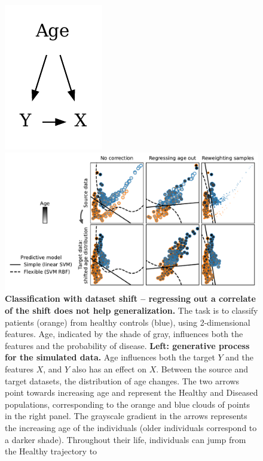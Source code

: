 \documentclass[a4paper,num-refs]{oup-contemporary}
\begin{document}
\begin{figure}[t!]
\begin{minipage}{.44\textwidth}
    \hspace*{.05\linewidth}%
    \includegraphics[width=.23\textwidth]{figures/graphs/parabolas_dataset.pdf}
  \end{minipage}%
  \hspace{-.2\textwidth}%
  \begin{minipage}{.69\textwidth}
    \includegraphics[width=\textwidth]{figures/simulations/parabolas_correction_and_shift/parabolas.pdf}
  \end{minipage}%
\caption{\label{fig:parabolas} %
  \textbf{Classification with dataset shift -- regressing out a correlate of the
shift does not help generalization.} The task is to classify patients
(orange) from healthy controls (blue), using
2-dimensional features. Age, indicated by the shade of gray, influences
both the features and the probability of disease.
  \textbf{Left: generative process for the simulated data.} Age influences
  both the target \(Y\) and the features \(X\), and \(Y\) also has an effect on
  \(X\). Between the source and target datasets, the distribution of age
  changes.
  The two arrows point towards increasing age and represent the Healthy and
  Diseased populations, corresponding to the orange and blue clouds of
  points in the right panel.
  The grayscale gradient in the arrows represents the increasing age of
the individuals (older individuals correspond to a darker shade).
  Throughout their life, individuals can jump from the Healthy trajectory to
}
\end{figure}
\end{document}
